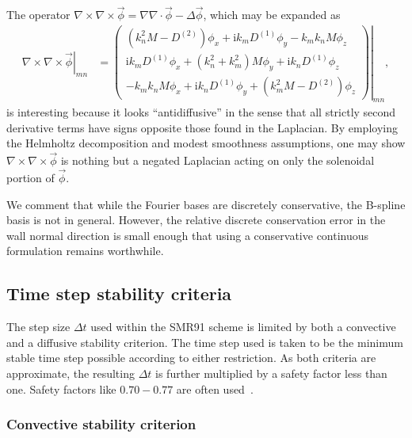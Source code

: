 \documentclass[letterpaper,11pt,nointlimits,reqno,draft]{amsart}
\newcommand{\ii}{\ensuremath{\mathrm{i}}}
\begin{document}
The operator $\nabla\times\nabla\times\vec{\phi} = \nabla\nabla\cdot\vec{\phi}
- \Delta\vec{\phi}$, which may be expanded as
\begin{align}
  \left.\nabla\times\nabla\times\vec{\phi}\right|_{m n}
&=
  \left.\begin{pmatrix}
    \left(k_n^2 M - D^{(2)}\right) \phi_{x} + \ii k_m D^{(1)} \phi_{y} - k_{m}k_{n} M \phi_{z} \\
    \ii k_m D^{(1)} \phi_{x} + \left(k_n^2 + k_m^2\right)M \phi_{y} + \ii k_n D^{(1)} \phi_{z} \\
    - k_{m}k_{n} M \phi_{x} + \ii k_n D^{(1)} \phi_{y} + \left(k_m^2 M - D^{(2)}\right) \phi_{z}
  \end{pmatrix}\right|_{m n}
  ,
\end{align}
is interesting because it looks ``antidiffusive'' in the sense that all
strictly second derivative terms have signs opposite those found in the
Laplacian.  By employing the Helmholtz decomposition and modest smoothness
assumptions, one may show $\nabla\times\nabla\times\vec{\phi}$ is nothing but a
negated Laplacian acting on only the solenoidal portion of $\vec{\phi}$.

We comment that while the Fourier bases are discretely conservative, the
B-spline basis is not in general.  However, the relative discrete conservation
error in the wall normal direction is small enough that using a conservative
continuous formulation remains worthwhile.

\subsection{Time step stability criteria}
\label{sec:stabilitycriteria}

The step size $\Delta{}t$ used within the SMR91 scheme is limited by both a
convective and a diffusive stability criterion.  The time step used is taken to
be the minimum stable time step possible according to either restriction.  As
both criteria are approximate, the resulting $\Delta{}t$ is further multiplied
by a safety factor less than one.  Safety factors like $0.70-0.77$ are often
used~\cite{Venugopal2003,spalart_lowstoragerk}.

\subsubsection{Convective stability criterion}
\label{sec:convectivestability}
\end{document}
